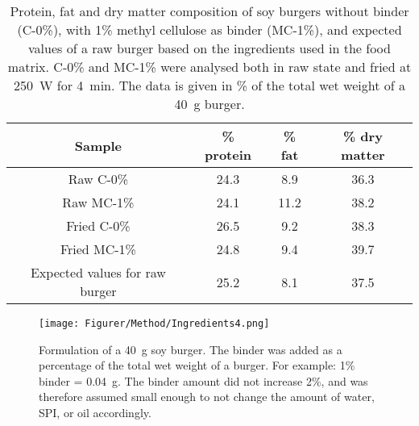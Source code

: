 \begin{table}[H]
    \caption{Protein, fat and dry matter composition of soy burgers without binder (C-0\%), with 1\% methyl cellulose as binder (MC-1\%), and expected values of a raw burger based on the ingredients used in the food matrix. C-0\% and MC-1\% were analysed both in raw state and fried at 250~W for 4~min. The data is given in \% of the total wet weight of a 40~g burger.}
    \centering
    \begin{tabular}{c|ccc}
\toprule

\textbf{Sample} &  \textbf{\% protein} & \textbf{\% fat} & \textbf{\% dry matter} \\

\hline

Raw C-0\%       & 24.3  & 8.9  & 36.3   \\
Raw MC-1\%      & 24.1  & 11.2 & 38.2   \\
Fried C-0\%     & 26.5  & 9.2  & 38.3   \\
Fried MC-1\%    & 24.8  & 9.4  & 39.7   \\
\hline
Expected values for raw burger & 25.2 & 8.1 & 37.5 \\ 

\bottomrule

    \end{tabular}%
    \label{tab:results:ProximateAnalyis:CompositionOfBurger:C&MC}
\end{table}

\begin{figure}[H]
    \centering
    \texttt{[image: Figurer/Method/Ingredients4.png]}
    \caption{Formulation of a 40~g soy burger. The binder was added as a percentage of the total wet weight of a burger. For example: 1\% binder = 0.04~g. The binder amount did not increase 2\%, and was therefore assumed small enough to not change the amount of water, SPI, or oil accordingly.}
    \label{fig:Method:PieDiagram:IngredientOverview}
\end{figure}